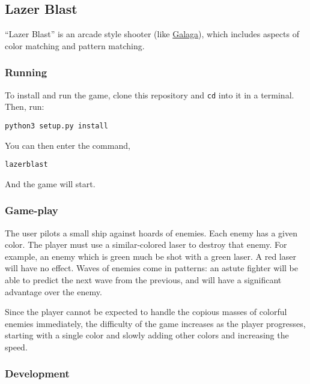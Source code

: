 \subsection*{Lazer Blast}\label{lazer-blast}

``Lazer Blast'' is an arcade style shooter (like
\href{https://en.wikipedia.org/wiki/Galaga}{Galaga}), which includes
aspects of color matching and pattern matching.

\subsubsection*{Running}\label{running}

To install and run the game, clone this repository and \texttt{cd} into
it in a terminal. Then, run:

\begin{verbatim}
python3 setup.py install
\end{verbatim}

You can then enter the command,

\begin{verbatim}
lazerblast
\end{verbatim}

And the game will start.

\subsubsection*{Game-play}\label{game-play}

The user pilots a small ship against hoards of enemies. Each enemy has a
given color. The player must use a similar-colored laser to destroy that
enemy. For example, an enemy which is green much be shot with a green
laser. A red laser will have no effect. Waves of enemies come in
patterns: an astute fighter will be able to predict the next wave from
the previous, and will have a significant advantage over the enemy.

Since the player cannot be expected to handle the copious masses of
colorful enemies immediately, the difficulty of the game increases as
the player progresses, starting with a single color and slowly adding
other colors and increasing the speed.

\subsubsection*{Development}\label{development}

